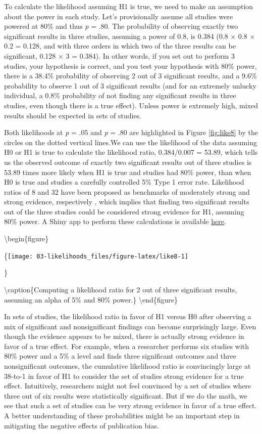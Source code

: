 \documentclass[
]{krantz}
\begin{document}
To calculate the likelihood assuming H1 is true, we need to make an assumption about the power in each study. Let's provisionally assume all studies were powered at 80\% and thus \emph{p} = .80. The probability of observing exactly two significant results in three studies, assuming a power of 0.8, is 0.384 (0.8 × 0.8 × 0.2 = 0.128, and with three orders in which two of the three results can be significant, 0.128 × 3 = 0.384). In other words, if you set out to perform 3 studies, your hypothesis is correct, and you test your hypothesis with 80\% power, there is a 38.4\% probability of observing 2 out of 3 significant results, and a 9.6\% probability to observe 1 out of 3 significant results (and for an extremely unlucky individual, a 0.8\% probability of not finding any significant results in three studies, even though there is a true effect). Unless power is extremely high, mixed results should be expected in sets of studies.

Both likelihoods at \emph{p} = .05 and \emph{p} = .80 are highlighted in Figure \ref{fig:like8} by the circles on the dotted vertical lines.We can use the likelihood of the data assuming H0 or H1 is true to calculate the likelihood ratio, 0.384/0.007 = 53.89, which tells us the observed outcome of exactly two significant results out of three studies is 53.89 times more likely when H1 is true and studies had 80\% power, than when H0 is true and studies a carefully controlled 5\% Type 1 error rate. Likelihood ratios of 8 and 32 have been proposed as benchmarks of moderately strong and strong evidence, respectively \citep{royall_statistical_1997}, which implies that finding two significant results out of the three studies could be considered strong evidence for H1, assuming 80\% power. A Shiny app to perform these calculations is available \href{https://shiny.ieis.tue.nl/mixed_results_likelihood/}{here}.

\textbackslash begin\{figure\}

\{\centering \texttt{[image: 03-likelihoods\_files/figure-latex/like8-1]}

\}

\textbackslash caption\{Computing a likelihood ratio for 2 out of three significant results, assuming an alpha of 5\% and 80\% power.\}\label{fig:like8}
\textbackslash end\{figure\}

In sets of studies, the likelihood ratio in favor of H1 versus H0 after observing a mix of significant and nonsignificant findings can become surprisingly large. Even though the evidence appears to be mixed, there is actually strong evidence in favor of a true effect. For example, when a researcher performs six studies with 80\% power and a 5\% a level and finds three significant outcomes and three nonsignificant outcomes, the cumulative likelihood ratio is convincingly large at 38-to-1 in favor of H1 to consider the set of studies strong evidence for a true effect. Intuitively, researchers
might not feel convinced by a set of studies where three out of six results were statistically significant. But if we do the math, we see that such a set of studies can be very strong evidence in favor of a true effect. A better understanding of these probabilities might be an important step in mitigating the negative effects of publication bias.
\end{document}
